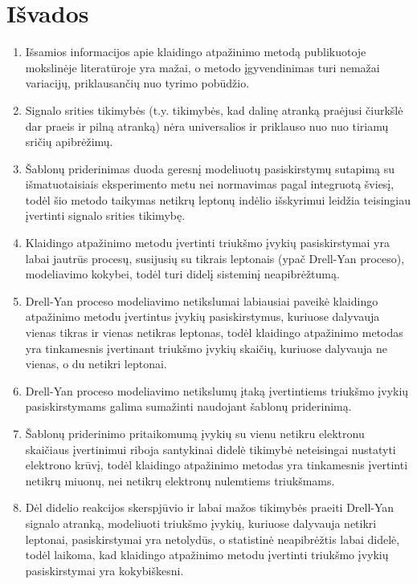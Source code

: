 \documentclass[a4paper, 12pt, oneside]{article}
\begin{document}
\section*{Išvados} 
\begin{enumerate}
	\item Išsamios informacijos apie klaidingo atpažinimo metodą publikuotoje mokslinėje literatūroje yra mažai, o metodo
	įgyvendinimas turi nemažai variacijų, priklausančių nuo tyrimo pobūdžio.
	\item Signalo srities tikimybės (t.y. tikimybės, kad dalinę atranką praėjusi čiurkšlė dar praeis ir pilną atranką) nėra
	universalios ir priklauso nuo nuo tiriamų sričių apibrėžimų.
	\item Šablonų priderinimas duoda geresnį modeliuotų pasiskirstymų sutapimą su išmatuotaisiais eksperimento metu 
	nei normavimas pagal integruotą šviesį, todėl šio metodo taikymas netikrų leptonų indėlio išskyrimui
	leidžia teisingiau įvertinti signalo srities tikimybę.
	\item Klaidingo atpažinimo metodu įvertinti triukšmo įvykių pasiskirstymai yra labai jautrūs procesų, susijusių su tikrais
	leptonais (ypač Drell-Yan proceso), modeliavimo kokybei, todėl turi didelį sisteminį neapibrėžtumą.
	\item Drell-Yan proceso modeliavimo netikslumai labiausiai paveikė klaidingo atpažinimo metodu įvertintus įvykių pasiskirstymus,
	kuriuose dalyvauja vienas tikras ir vienas netikras leptonas, todėl klaidingo atpažinimo metodas yra tinkamesnis
	įvertinant triukšmo įvykių skaičių, kuriuose dalyvauja ne vienas, o du netikri leptonai.
	\item Drell-Yan proceso modeliavimo netikslumų įtaką įvertintiems triukšmo įvykių pasiskirstymams galima sumažinti naudojant
	šablonų priderinimą.
	\item Šablonų priderinimo pritaikomumą įvykių su vienu netikru elektronu skaičiaus įvertinimui riboja
	santykinai didelė tikimybė neteisingai nustatyti elektrono krūvį, todėl klaidingo atpažinimo metodas yra tinkamesnis
	įvertinti netikrų miuonų, nei netikrų elektronų nulemtiems triukšmams.
	\item Dėl didelio reakcijos skerspjūvio ir labai mažos tikimybės praeiti Drell-Yan signalo atranką, modeliuoti triukšmo
	įvykių, kuriuose dalyvauja netikri leptonai, pasiskirstymai yra netolydūs, o statistinė neapibrėžtis labai didelė,
	todėl laikoma, kad klaidingo atpažinimo metodu įvertinti triukšmo įvykių pasiskirstymai yra kokybiškesni. 
\end{enumerate}
\end{document}
